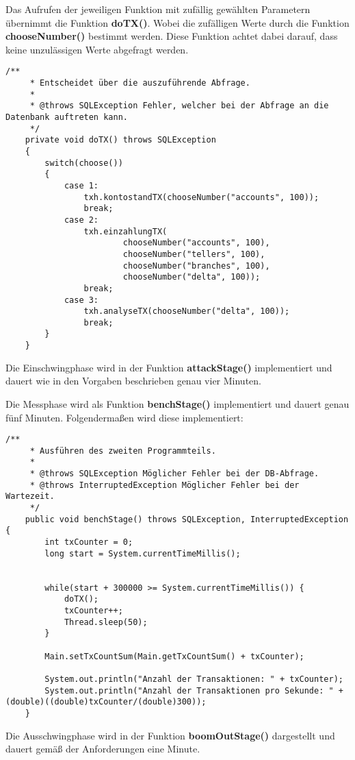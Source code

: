 Das Aufrufen der jeweiligen Funktion mit zufällig gewählten Parametern
übernimmt die Funktion \textbf{doTX()}. Wobei die zufälligen Werte durch die
Funktion \textbf{chooseNumber()} bestimmt werden. Diese Funktion achtet dabei
darauf, dass keine unzulässigen Werte abgefragt werden.


\begin{lstlisting}[caption={doTX-Funktion in ProgramStage.java}]
	/**
	 * Entscheidet über die auszuführende Abfrage.
	 * 
	 * @throws SQLException Fehler, welcher bei der Abfrage an die Datenbank auftreten kann.
	 */
	private void doTX() throws SQLException
	{
		switch(choose())
		{
			case 1:
				txh.kontostandTX(chooseNumber("accounts", 100));
				break;
			case 2:
				txh.einzahlungTX(
						chooseNumber("accounts", 100),
						chooseNumber("tellers", 100),
						chooseNumber("branches", 100),
						chooseNumber("delta", 100));
				break;
			case 3:
				txh.analyseTX(chooseNumber("delta", 100));
				break;
		}
	}
\end{lstlisting}

Die Einschwingphase wird in der Funktion \textbf{attackStage()} implementiert
und dauert wie in den Vorgaben beschrieben genau vier Minuten.

\clearpage

Die Messphase wird als Funktion \textbf{benchStage()} implementiert und dauert
genau fünf Minuten. Folgendermaßen wird diese implementiert:
\begin{lstlisting}[caption={benchStage-Funktion in ProgramStage.java}]
	/**
	 * Ausführen des zweiten Programmteils.
	 * 
	 * @throws SQLException Möglicher Fehler bei der DB-Abfrage.
	 * @throws InterruptedException Möglicher Fehler bei der Wartezeit.
	 */
	public void benchStage() throws SQLException, InterruptedException {
		int txCounter = 0;
		long start = System.currentTimeMillis();
		
		
		while(start + 300000 >= System.currentTimeMillis()) {
			doTX();
			txCounter++;
			Thread.sleep(50);	
		}
		
		Main.setTxCountSum(Main.getTxCountSum() + txCounter);
		
		System.out.println("Anzahl der Transaktionen: " + txCounter);
		System.out.println("Anzahl der Transaktionen pro Sekunde: " + (double)((double)txCounter/(double)300));
	}
\end{lstlisting}

Die Ausschwingphase wird in der Funktion \textbf{boomOutStage()} dargestellt und
dauert gemäß der Anforderungen eine Minute.

